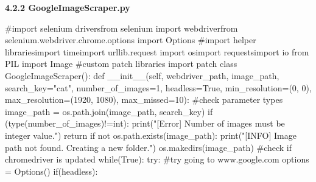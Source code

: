 \documentclass[10pt]{article} %
\begin{document}
\begin{spacing}{1.5}
\noindent 

\vspace{2mm}

\noindent \textbf{\large 4.2.2 GoogleImageScraper.py}
\vspace{2mm}

\noindent \textbf{}

\noindent \#import selenium driversfrom selenium \newline
import webdriverfrom selenium.webdriver.chrome.options \newline import Options
\newline\#import helper librariesimport timeimport urllib.request\newline 
import os\newline import requests\newline import io from PIL \newline import Image\newline
\#custom patch libraries\newline
import patch \newline
class GoogleImageScraper():
\newline def \_\_init\_\_(self, webdriver\_path, image\_path, search\_key="cat", number\_of\_images=1, headless=True, min\_resolution=(0, 0), max\_resolution=(1920, 1080), max\_missed=10):    \newline    \#check parameter types     \newline   image\_path = os.path.join(image\_path, search\_key)        \newline if (type(number\_of\_images)!=int):    \newline        print("[Error] Number of images must be integer value.")     \newline       return   \newline     if not os.path.exists(image\_path):   \newline
print("[INFO] Image path not found. Creating a new folder.")    \newline        os.makedirs(image\_path)    \newline
\#check if chromedriver is updated  \newline
while(True):    \newline
try:    \newline
\#try going to www.google.com       \newline
options = Options()         \newline       
if(headless):       \newline

\end{spacing}
\end{document}
